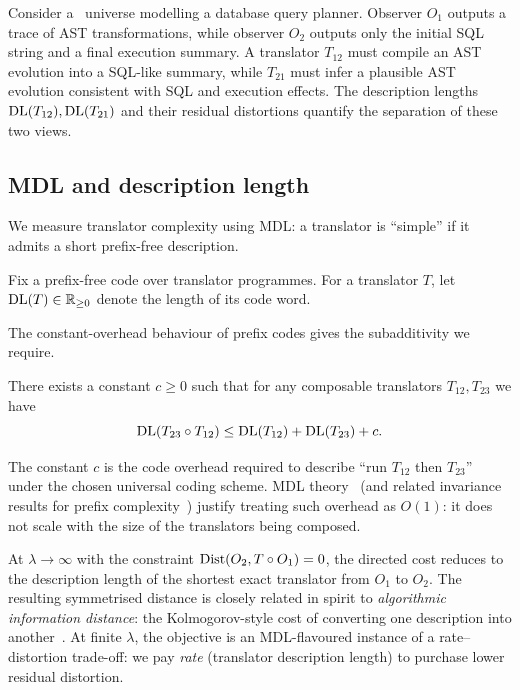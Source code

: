 \documentclass{aion}
\begin{document}
\begin{example}\label{ex:sql-ast}
Consider a \WARP\ universe modelling a database query planner.
Observer $O_1$ outputs a trace of AST transformations, while observer $O_2$ outputs only the initial SQL string
and a final execution summary.
A translator $T_{12}$ must compile an AST evolution into a SQL-like summary, while $T_{21}$ must infer a plausible AST evolution
consistent with SQL and execution effects.
The description lengths $\operatorname{DL}(T_{12}),\operatorname{DL}(T_{21})$ and their residual distortions quantify the separation of these two views.
\end{example}

\subsection{MDL and description length}
\label{subsec:mdl}

We measure translator complexity using MDL: a translator is ``simple'' if it admits a short prefix-free description.

\begin{definition}\label{def:dl}
Fix a prefix-free code over translator programmes.
For a translator $T$, let $\operatorname{DL}(T)\in\mathbb{R}_{\ge 0}$ denote the length of its code word.
\end{definition}

The constant-overhead behaviour of prefix codes gives the subadditivity we require.

\begin{assumption}\label{ass:dl-subadd}
There exists a constant $c\ge 0$ such that for any composable translators $T_{12},T_{23}$ we have
\[
  \operatorname{DL}(T_{23}\circ T_{12}) \le \operatorname{DL}(T_{12}) + \operatorname{DL}(T_{23}) + c.
\]
\end{assumption}

\begin{remark}
The constant $c$ is the code overhead required to describe ``run $T_{12}$ then $T_{23}$'' under the chosen universal coding scheme.
MDL theory~\cite{Ris78} (and related invariance results for prefix complexity~\cite{LiVitanyi2019}) justify treating such overhead as $O(1)$:
it does not scale with the size of the translators being composed.
\end{remark}
\begin{remark}
At $\lambda\to\infty$ with the constraint $\operatorname{Dist}(O_2,T\circ O_1)=0$, the directed cost
reduces to the description length of the shortest exact translator from $O_1$ to $O_2$.
The resulting symmetrised distance is closely related in spirit to \emph{algorithmic information distance}:
the Kolmogorov-style cost of converting one description into another~\cite{Bennett98,LiVitanyi2019}.
At finite $\lambda$, the objective is an MDL-flavoured instance of a rate--distortion trade-off:
we pay \emph{rate} (translator description length) to purchase lower residual distortion.
\end{remark}
\end{document}

